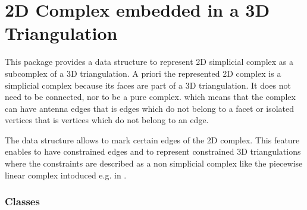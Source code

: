 \chapter{2D Complex embedded in a 3D Triangulation}
\label{ref_chapter_Complex2inTriangulation3}
\label{ref_chapter_C2inT3}

\vspace*{-15mm}
\minitoc
\vspace*{30mm}

This package provides a data structure to  represent 
2D simplicial complex as a subcomplex of a 3D triangulation.
A priori the represented 2D complex is a  simplicial complex
because its faces are part of a 3D triangulation.
It does not need to be connected, nor to be a pure complex.
which  means that the complex can have antenna edges 
that is edges which do not belong to a facet or
isolated vertices that is vertices  which do not belong to
an edge.

The data structure allows to mark certain edges of the 2D complex.
This feature enables  to have  constrained edges
and to represent constrained 3D triangulations
where the constraints are described 
as a non simplicial complex like the piecewise linear complex
intoduced  e.g. in \cite{s-cgehd-98}.

\subsection*{Classes}
